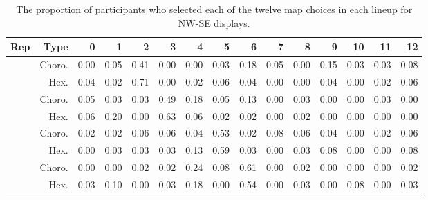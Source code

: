 \documentclass{monashthesis}
\begin{document}
\begin{table}

\caption{\label{tab:choice-nwse}The proportion of participants who selected each of the twelve map choices in each lineup for NW-SE displays.}
\centering
\begin{tabular}[t]{rrrrrrrrrrrrrrr}
\toprule
Rep & Type & 0 & 1 & 2 & 3 & 4 & 5 & 6 & 7 & 8 & 9 & 10 & 11 & 12\\
\midrule
 & Choro. & 0.00 & 0.05 & 0.41 & 0.00 & 0.00 & 0.03 & 0.18 & 0.05 & 0.00 & 0.15 & 0.03 & 0.03 & 0.08\\
\cmidrule{2-15}
\multirow{-2}{*}{\raggedleft\arraybackslash 1} & Hex. & 0.04 & 0.02 & 0.71 & 0.00 & 0.02 & 0.06 & 0.04 & 0.00 & 0.00 & 0.04 & 0.00 & 0.02 & 0.06\\
\cmidrule{1-15}
 & Choro. & 0.05 & 0.03 & 0.03 & 0.49 & 0.18 & 0.05 & 0.13 & 0.00 & 0.03 & 0.00 & 0.00 & 0.03 & 0.00\\
\cmidrule{2-15}
\multirow{-2}{*}{\raggedleft\arraybackslash 2} & Hex. & 0.06 & 0.20 & 0.00 & 0.63 & 0.06 & 0.02 & 0.02 & 0.00 & 0.02 & 0.00 & 0.00 & 0.00 & 0.00\\
\cmidrule{1-15}
 & Choro. & 0.02 & 0.02 & 0.06 & 0.06 & 0.04 & 0.53 & 0.02 & 0.08 & 0.06 & 0.04 & 0.00 & 0.02 & 0.06\\
\cmidrule{2-15}
\multirow{-2}{*}{\raggedleft\arraybackslash 3} & Hex. & 0.00 & 0.03 & 0.03 & 0.03 & 0.13 & 0.59 & 0.03 & 0.00 & 0.03 & 0.08 & 0.00 & 0.00 & 0.08\\
\cmidrule{1-15}
 & Choro. & 0.00 & 0.00 & 0.02 & 0.02 & 0.24 & 0.08 & 0.61 & 0.00 & 0.02 & 0.00 & 0.00 & 0.00 & 0.02\\
\cmidrule{2-15}
\multirow{-2}{*}{\raggedleft\arraybackslash 4} & Hex. & 0.03 & 0.10 & 0.00 & 0.03 & 0.18 & 0.00 & 0.54 & 0.00 & 0.03 & 0.00 & 0.08 & 0.00 & 0.03\\
\bottomrule
\end{tabular}
\end{table}
\end{document}
